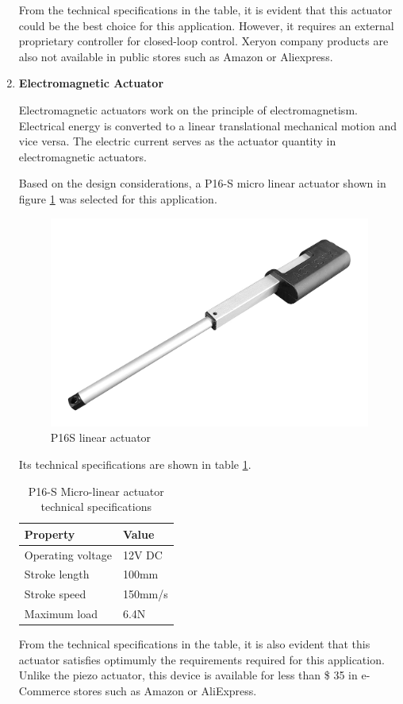 \begin{enumerate}
    
    From the technical specifications in the table, it is evident that this actuator could be the best choice for this application. However, it requires an external proprietary controller for closed-loop control. Xeryon company products are also not available in public stores such as Amazon or Aliexpress.
    
    \item \textbf{Electromagnetic Actuator}
    \par
    Electromagnetic actuators work on the principle of electromagnetism. Electrical energy is converted to a linear translational mechanical motion and vice versa. The electric current serves as the actuator quantity in electromagnetic actuators.
    \par
    Based on the design considerations, a P16-S micro linear actuator shown in figure \ref{fig:p16_s_linear_actuator}  was selected for this application.
    \begin{figure}[H]
        \centering
        \includegraphics[width=.25\textwidth, height=.25\textheight]{Figures/P16S.jpg}
        \caption[P16S linear actuator]{P16S linear actuator \cite{p16_s}}
        \label{fig:p16_s_linear_actuator}
    \end{figure}
    Its technical specifications are shown in table \ref{tab:p16_s}.
    \begin{table}[H]
    \centering
    \begin{tabular}{|l|l|}
    \hline
    \textbf{Property} & \textbf{Value} \\ \hline
    Operating voltage & 12V DC \\ \hline
    Stroke length & 100mm \\ \hline
    Stroke speed & 150mm/s \\ \hline
    Maximum load & 6.4N \\ \hline
    \end{tabular}
    \caption[P16-S Micro-linear actuator technical specifications]{P16-S Micro-linear actuator technical specifications \cite{p16_s}}
    \label{tab:p16_s}
    \end{table}
    From the technical specifications in the table, it is also evident that this actuator satisfies optimumly the requirements required for this application. Unlike the piezo actuator, this device is available for less than \$ 35 in e-Commerce stores such as Amazon or AliExpress.
\end{enumerate}

